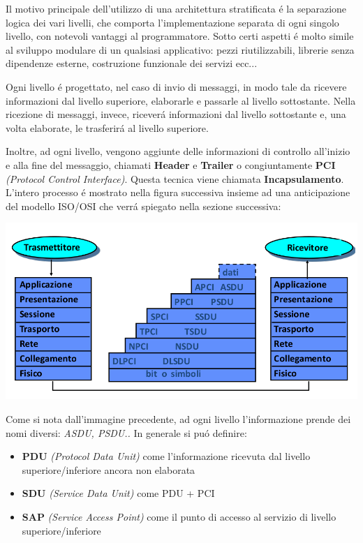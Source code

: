 \documentclass[12pt]{article}
\begin{document}
Il motivo principale dell'utilizzo di una architettura stratificata \'e la separazione logica dei vari livelli, che comporta
l'implementazione separata di ogni singolo livello, con notevoli vantaggi al programmatore. Sotto certi aspetti \'e molto
simile al sviluppo modulare di un qualsiasi applicativo: pezzi riutilizzabili, librerie senza dipendenze esterne, costruzione 
funzionale dei servizi ecc...

Ogni livello \'e progettato, nel caso di invio di messaggi, in modo tale da ricevere informazioni dal livello 
superiore, elaborarle e passarle al livello sottostante. Nella ricezione di messaggi, invece, ricever\'a informazioni dal 
livello sottostante e, una volta elaborate, le trasferir\'a al livello superiore.

Inoltre, ad ogni livello, vengono aggiunte delle informazioni di controllo all'inizio e alla fine del messaggio, chiamati 
\textbf{Header} e \textbf{Trailer} o congiuntamente \textbf{PCI} \textit{(Protocol Control Interface)}. Questa tecnica viene 
chiamata \textbf{Incapsulamento}. L'intero processo \'e mostrato nella figura successiva insieme ad una anticipazione del modello 
ISO/OSI che verr\'a spiegato nella sezione successiva:
\begin{center}
	\includegraphics[scale=0.4]{introduzione-img13.png}
\end{center}
Come si nota dall'immagine precedente, ad ogni livello l'informazione prende dei nomi diversi: \textit{ASDU, PSDU..}
In generale si pu\'o definire: 
\begin{itemize}[noitemsep]
    \item \textbf{PDU} \textit{(Protocol Data Unit)} come l'informazione ricevuta dal livello superiore/inferiore ancora non 
    elaborata
    \item \textbf{SDU} \textit{(Service Data Unit)} come PDU + PCI
    \item \textbf{SAP} \textit{(Service Access Point)} come il punto di accesso al servizio di livello superiore/inferiore
\end{itemize}
\end{document}
